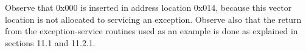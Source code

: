 \documentclass[11pt, twoside, pdftex]{article}
\newcommand{\commonPath}{../../Common}
\begin{document}
Observe that 0x000 is inserted in address location 0x014,
because this vector location is not allocated to servicing an
exception. Observe also that the return from the
exception-service routines used as an example is done as
explained in sections 11.1 and 11.2.1.





\end{document}

